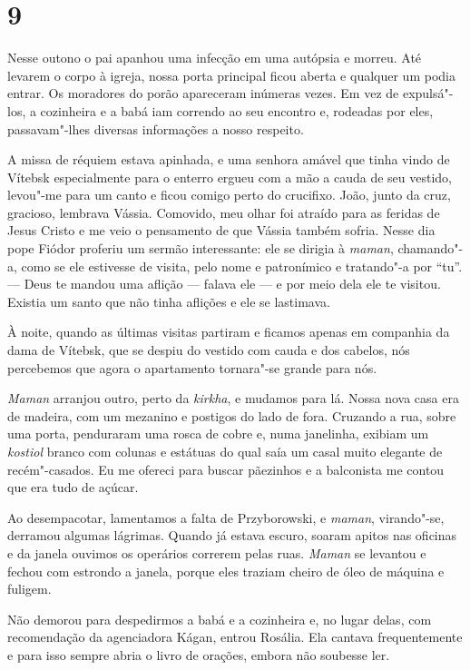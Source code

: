 \section{9}

Nesse outono o pai apanhou uma infecção em uma autópsia e morreu. Até
levarem o corpo à igreja, nossa porta principal ficou aberta e qualquer
um podia entrar. Os moradores do porão apareceram inúmeras vezes. Em vez
de expulsá"-los, a cozinheira e a babá iam correndo ao seu encontro e,
rodeadas por eles, passavam"-lhes diversas informações a nosso respeito.

A missa de réquiem estava apinhada, e uma senhora amável que tinha vindo
de Vítebsk especialmente para o enterro ergueu com a mão a cauda de seu
vestido, levou"-me para um canto e ficou comigo perto do crucifixo. João,
junto da cruz, gracioso, lembrava Vássia. Comovido, meu olhar foi
atraído para as feridas de Jesus Cristo e me veio o pensamento de que
Vássia também sofria. Nesse dia pope Fiódor proferiu um sermão
interessante: ele se dirigia à \emph{maman}, chamando"-a, como se ele
estivesse de visita, pelo nome e patronímico e tratando"-a por ``tu''.
--- Deus te mandou uma aflição --- falava ele --- e por meio dela ele te
visitou. Existia um santo que não tinha aflições e ele se lastimava.

À noite, quando as últimas visitas partiram e ficamos apenas em
companhia da dama de Vítebsk, que se despiu do vestido com cauda e dos
cabelos, nós percebemos que agora o apartamento tornara"-se grande para
nós.

\emph{Maman} arranjou outro, perto da \emph{kirkha}, e mudamos para lá.
Nossa nova casa era de madeira, com um mezanino e postigos do lado de
fora. Cruzando a rua, sobre uma porta, penduraram uma rosca de cobre e,
numa janelinha, exibiam um \emph{kostiol} branco com colunas e estátuas
do qual saía um casal muito elegante de recém"-casados. Eu me ofereci
para buscar pãezinhos e a balconista me contou que era tudo de açúcar.

Ao desempacotar, lamentamos a falta de Przyborowski, e \emph{maman},
virando"-se, derramou algumas lágrimas. Quando já estava escuro, soaram
apitos nas oficinas e da janela ouvimos os operários correrem pelas
ruas. \emph{Maman} se levantou e fechou com estrondo a janela, porque
eles traziam cheiro de óleo de máquina e fuligem.

Não demorou para despedirmos a babá e a cozinheira e, no lugar delas,
com recomendação da agenciadora Kágan, entrou Rosália. Ela cantava
frequentemente e para isso sempre abria o livro de orações, embora não
soubesse ler.

